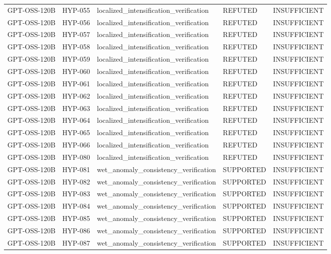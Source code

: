 \begin{tabular}{lllll}
GPT-OSS-120B & HYP-055 & localized_intensification_verification & REFUTED & INSUFFICIENT \\
GPT-OSS-120B & HYP-056 & localized_intensification_verification & REFUTED & INSUFFICIENT \\
GPT-OSS-120B & HYP-057 & localized_intensification_verification & REFUTED & INSUFFICIENT \\
GPT-OSS-120B & HYP-058 & localized_intensification_verification & REFUTED & INSUFFICIENT \\
GPT-OSS-120B & HYP-059 & localized_intensification_verification & REFUTED & INSUFFICIENT \\
GPT-OSS-120B & HYP-060 & localized_intensification_verification & REFUTED & INSUFFICIENT \\
GPT-OSS-120B & HYP-061 & localized_intensification_verification & REFUTED & INSUFFICIENT \\
GPT-OSS-120B & HYP-062 & localized_intensification_verification & REFUTED & INSUFFICIENT \\
GPT-OSS-120B & HYP-063 & localized_intensification_verification & REFUTED & INSUFFICIENT \\
GPT-OSS-120B & HYP-064 & localized_intensification_verification & REFUTED & INSUFFICIENT \\
GPT-OSS-120B & HYP-065 & localized_intensification_verification & REFUTED & INSUFFICIENT \\
GPT-OSS-120B & HYP-066 & localized_intensification_verification & REFUTED & INSUFFICIENT \\
GPT-OSS-120B & HYP-080 & localized_intensification_verification & REFUTED & INSUFFICIENT \\
GPT-OSS-120B & HYP-081 & wet_anomaly_consistency_verification & SUPPORTED & INSUFFICIENT \\
GPT-OSS-120B & HYP-082 & wet_anomaly_consistency_verification & SUPPORTED & INSUFFICIENT \\
GPT-OSS-120B & HYP-083 & wet_anomaly_consistency_verification & SUPPORTED & INSUFFICIENT \\
GPT-OSS-120B & HYP-084 & wet_anomaly_consistency_verification & SUPPORTED & INSUFFICIENT \\
GPT-OSS-120B & HYP-085 & wet_anomaly_consistency_verification & SUPPORTED & INSUFFICIENT \\
GPT-OSS-120B & HYP-086 & wet_anomaly_consistency_verification & SUPPORTED & INSUFFICIENT \\
GPT-OSS-120B & HYP-087 & wet_anomaly_consistency_verification & SUPPORTED & INSUFFICIENT \\

\end{tabular}

